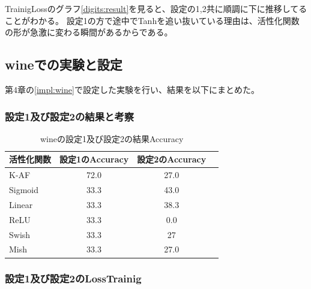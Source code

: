TrainigLossのグラフ\ref{digits:result}を見ると、設定の1,2共に順調に下に推移してることがわかる。
設定1の方で途中でTanhを追い抜いている理由は、活性化関数の形が急激に変わる瞬間があるからである。


\subsection{wineでの実験と設定}
\label{ev:wineでの実験と設定}

第4章の\ref{impl:wine}で設定した実験を行い、結果を以下にまとめた。
\subsubsection{設定1及び設定2の結果と考察}


\begin{table}[htbp]
    \begin{center}
        \caption{wineの設定1及び設定2の結果Accuracy}
        \vspace{2mm} 
        \begin{tabular}{l*{2}{c}r}
            活性化関数              & 設定1のAccuracy &  設定2のAccuracy \\
            \hline
            K-AF            & 72.0 & 27.0 \\
            Sigmoid            & 33.3 & 43.0\\
            Linear            & 33.3 & 38.3\\
            ReLU        & 33.3 & 0.0\\
            Swish           & 33.3 & 27 \\
            Mish           & 33.3 &  27.0\\
    
        \end{tabular}
    \end{center}
\end{table}


\subsubsection{設定1及び設定2のLossTrainig}
\label{digits:loss}

